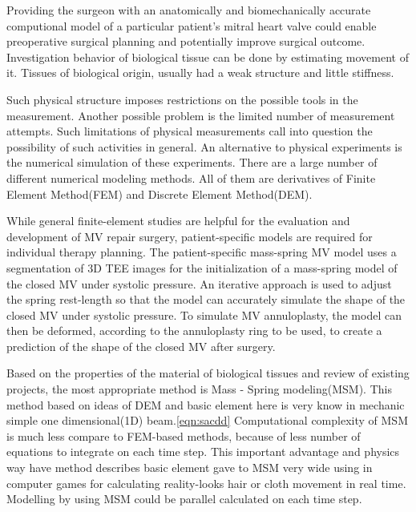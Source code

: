 Providing the surgeon with an anatomically and biomechanically accurate
computional model of a particular patient's mitral heart valve could enable
preoperative surgical planning and potentially improve surgical outcome.
Investigation behavior of biological tissue can be done by estimating movement
of it. Tissues of biological origin, usually had a weak structure and little
stiffness.
\par
Such physical structure imposes restrictions on the possible tools in the
measurement. Another possible problem is the limited number of measurement
attempts. Such limitations of physical measurements call into question the
possibility of such activities in general. An alternative to physical
experiments is the numerical simulation of these experiments. There are a large
number of different numerical modeling methods. All of them are derivatives of
Finite Element Method(FEM) and Discrete Element Method(DEM).
\par
While general finite-element studies are helpful for the evaluation and
development of MV repair surgery, patient-specific models are required for
individual therapy planning.
The patient-specific mass-spring MV model uses a segmentation of 3D TEE images
for the initialization of a mass-spring model of the closed MV under systolic
pressure. An iterative approach is used to adjust the spring rest-length so that
the model can accurately simulate the shape of the closed MV under systolic
pressure. To simulate MV annuloplasty, the model can then be deformed, according
to the annuloplasty ring to be used, to create a prediction of the shape of the
closed MV after surgery.
\par
Based on the properties of the material of biological tissues and review of
existing projects, the most appropriate method is Mass - Spring modeling(MSM). This
method based on ideas of DEM and basic element here is very know in mechanic
simple one dimensional(1D) beam.\ref{eqn:sacdd}
Computational complexity of MSM is much less compare to FEM-based methods,
because of less number of equations to integrate on each time step. This
important advantage and physics way have method describes basic element gave to
MSM very wide using in computer games for calculating reality-looks hair or
cloth movement in real time. Modelling by using MSM could be parallel calculated
on each time step.\cite{Rasmusson2008} \cite{Amorim2012}
\par
